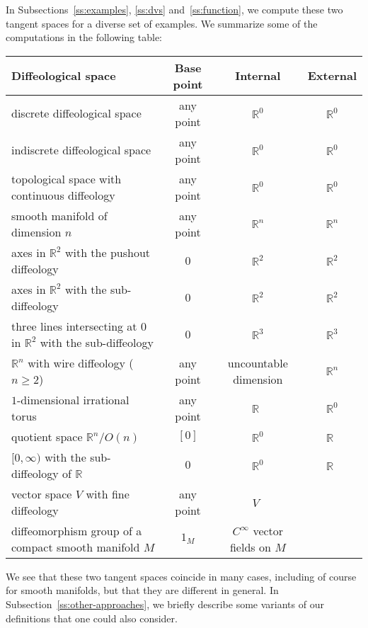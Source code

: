 \documentclass{amsart}
\theoremstyle{remark}
\def \R{\mathbb{R}}
\begin{document}
In Subsections~\ref{ss:examples}, \ref{ss:dvs} and~\ref{ss:function}, we compute
these two tangent spaces for a diverse set of examples.
We summarize some of the computations in the following table:
\medskip
\begin{center}
%
\setlength\extrarowheight{1pt}
%
\renewcommand{\arraystretch}{1.1}
\begin{tabular}{|l|c|c|c|}
\hline
\bf Diffeological space & \bf Base point & \bf Internal & \bf External \\
\hline
discrete diffeological space & any point & $\R^0$ & $\R^0$ \\
\hline
indiscrete diffeological space & any point & $\R^0$ & $\R^0$ \\
\hline
topological space with continuous diffeology & any point & $\R^0$ & $\R^0$ \\
\hline
smooth manifold of dimension $n$ & any point & $\R^n$ & $\R^n$ \\
\hline
axes in $\R^2$ with the pushout diffeology & 0 & $\R^2$ & $\R^2$ \\
%
%
%
\hline
axes in $\R^2$ with the sub-diffeology & 0 & $\R^2$ & $\R^2$ \\
%
%
\hline
\parbox[c][2.5em]{2in}{\raggedright three lines intersecting at $0$ in $\R^2$\\[1pt]
with the sub-diffeology} & 0 & $\R^3$ & $\R^3$ \\
\hline
$\R^n$ with wire diffeology ($n \geq 2$) & any point
& \parbox[c][2.5em]{.75in}{\raggedright uncountable\\[-1pt] dimension} & $\R^n$ \\
\hline
$1$-dimensional irrational torus & any point & $\R^{\phantom{1}}$ & $\R^0$ \\
\hline
quotient space $\R^n/O(n)$ & $[0]$ & $\R^0$ & $\R^{\phantom{1}}$ \\
\hline
$[0,\infty)$ with the sub-diffeology of $\R$ & $0$ & $\R^0$ & $\R^{\phantom{1}}$ \\
\hline
vector space $V$ with fine diffeology & any point & $V^{\phantom{1}}$ & \\
\hline
\parbox[c][2.5em]{1.8in}{\raggedright diffeomorphism group of a\\[-1pt]
compact smooth manifold $M$}
& $1_M$ & \parbox[c][2.5em]{.75in}{\raggedright $C^\infty$ vector\\[-1pt] fields on $M$} & \\
\hline
\end{tabular}
\end{center}
\medskip
We see that these two tangent spaces coincide in many cases, including of
course for smooth manifolds, but that they are different in general.
In Subsection~\ref{ss:other-approaches}, we briefly describe some variants
of our definitions that one could also consider.
\end{document}
